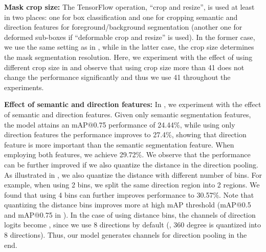 \textbf{Mask crop size:} The TensorFlow operation, ``crop and resize'', is used at least in two places: one for box classification and one for cropping semantic and direction features for foreground/background segmentation (another one for deformed sub-boxes if ``deformable crop and resize'' is used). In the former case, we use the same setting as in \cite{huang2016speed, sun2017revisiting}, while in the latter case, the crop size determines the mask segmentation resolution. Here, we experiment with the effect of using different crop size in  and observe that using crop size more than 41 does not change the performance significantly and thus we use 41 throughout the experiments.

\begin{table}[!t]
  \centering
  \caption{Using crop size = 41 is sufficient for mask segmentation.}
  \label{tab:mask_crop_size}
\end{table}

\textbf{Effect of semantic and direction features:} In , we experiment with the effect of semantic and direction features. Given only semantic segmentation features, the model attains an mAP@0.75 performance of 24.44\%, while using only direction features the performance improves to 27.4\%, showing that direction feature is more important than the semantic segmentation feature. When employing both features, we achieve 29.72\%. We observe that the performance can be further improved if we also quantize the distance in the direction pooling. As illustrated in , we also quantize the distance with different number of bins. For example, when using 2 bins, we split the same direction region into 2 regions. We found that using 4 bins can further improves performance to 30.57\%. Note that quantizing the distance bins improves more at high mAP threshold (\cf mAP@0.5 and mAP@0.75 in ). In the case of using  distance bins, the channels of direction logits become , since we use 8 directions by default (\ie, 360 degree is quantized into 8 directions). Thus, our model generates  channels for direction pooling in the end.

